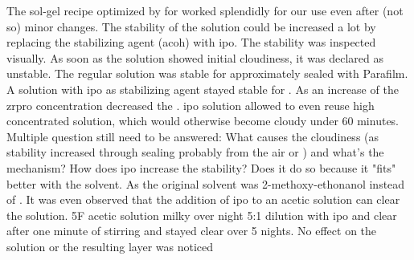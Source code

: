 The sol-gel recipe optimized by \cite{Hu2016} for  worked splendidly for our use even after (not so) minor changes.
The stability of the solution could be increased a lot by replacing the stabilizing agent (\gls{acoh}) with \gls{ipo}.
The stability was inspected visually. 
As soon as the solution showed initial cloudiness, it was declared as unstable. 
The regular solution was stable for approximately  sealed with Parafilm. 
A solution with \gls{ipo} as stabilizing agent stayed stable for . 
As an increase of the \gls{zrpro} concentration decreased the . 
%
\Gls{ipo} solution allowed to even reuse high concentrated solution, which would otherwise become cloudy under 60 minutes. 
Multiple question still need to be answered: 
What causes the cloudiness (as stability increased through sealing probably  from the air or ) and what's the mechanism? 
How does \gls{ipo} increase the stability? 
Does it do so because it "fits" better with the solvent. 
As the original solvent was 2-methoxy-ethonanol instead of . 
It was even observed that the addition of  \gls{ipo} to an acetic solution can clear the solution.
5F acetic solution milky over night 5:1 dilution with \gls{ipo} and clear after one minute of stirring and stayed clear over 5 nights.
No effect on the solution or the resulting layer was noticed 


